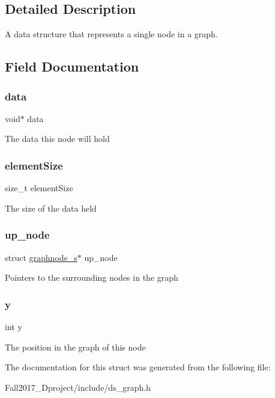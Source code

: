 \subsection{Detailed Description}
A data structure that represents a single node in a graph. 

\subsection{Field Documentation}
\mbox{\label{structgraphnode__s_a735984d41155bc1032e09bece8f8d66d}} 
\subsubsection{\texorpdfstring{data}{data}}
{\footnotesize\ttfamily void$\ast$ data}

The data this node will hold \mbox{\label{structgraphnode__s_af884332e6713af9425451adde09e0024}} 
\subsubsection{\texorpdfstring{element\+Size}{elementSize}}
{\footnotesize\ttfamily size\+\_\+t element\+Size}

The size of the data held \mbox{\label{structgraphnode__s_a7101dbac1154ba59495fffbdb030eba2}} 
\subsubsection{\texorpdfstring{up\+\_\+node}{up\_node}}
{\footnotesize\ttfamily struct \hyperlink{structgraphnode__s}{graphnode\+\_\+s}$\ast$ up\+\_\+node}

Pointers to the surrounding nodes in the graph \mbox{\label{structgraphnode__s_a0a2f84ed7838f07779ae24c5a9086d33}} 
\subsubsection{\texorpdfstring{y}{y}}
{\footnotesize\ttfamily int y}

The position in the graph of this node 

The documentation for this struct was generated from the following file\+:\begin{DoxyCompactItemize}
\item 
Fall2017\+\_\+Dproject/include/ds\+\_\+graph.\+h\end{DoxyCompactItemize}
